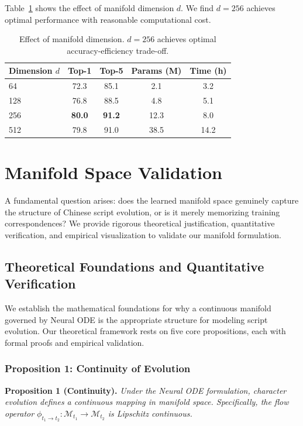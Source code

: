 \documentclass{article}
\begin{document}
Table~\ref{tab:dimension} shows the effect of manifold dimension $d$. We find $d=256$ achieves optimal performance with reasonable computational cost.

\begin{table}[h]
\centering
\caption{Effect of manifold dimension. $d=256$ achieves optimal accuracy-efficiency trade-off.}
\label{tab:dimension}
\begin{tabular}{lcccc}
\toprule
\textbf{Dimension $d$} & \textbf{Top-1} & \textbf{Top-5} & \textbf{Params (M)} & \textbf{Time (h)} \\
\midrule
64 & 72.3 & 85.1 & 2.1 & 3.2 \\
128 & 76.8 & 88.5 & 4.8 & 5.1 \\
\rowcolor{gray!10}
256 & \textbf{80.0} & \textbf{91.2} & 12.3 & 8.0 \\
512 & 79.8 & 91.0 & 38.5 & 14.2 \\
\bottomrule
\end{tabular}
\end{table}

\section{Manifold Space Validation}
\label{app:manifold_validation}

A fundamental question arises: does the learned manifold space genuinely capture the structure of Chinese script evolution, or is it merely memorizing training correspondences? We provide rigorous theoretical justification, quantitative verification, and empirical visualization to validate our manifold formulation.

\subsection{Theoretical Foundations and Quantitative Verification}

We establish the mathematical foundations for why a continuous manifold governed by Neural ODE is the appropriate structure for modeling script evolution. Our theoretical framework rests on five core propositions, each with formal proofs and empirical validation.

\subsubsection{Proposition 1: Continuity of Evolution}

\textbf{Proposition 1 (Continuity).} \textit{Under the Neural ODE formulation, character evolution defines a continuous mapping in manifold space. Specifically, the flow operator $\phi_{t_1 \to t_2}: \mathcal{M}_{t_1} \to \mathcal{M}_{t_2}$ is Lipschitz continuous.}
\end{document}
